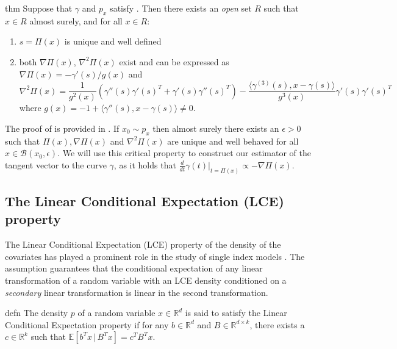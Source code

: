 \documentclass[11pt]{article}
\begin{document}
\begin{restatable}[Differentiability of $\Pi$]{thm}{} \label{thm: differentiability of pi}
    Suppose that $\gamma$ and $p_{x}$ satisfy . Then there exists an \textit{open} set $R$ such that $x \in R$ almost surely, and for all $x \in R$:
    \begin{enumerate}
        \item $s = \Pi(x)$ is unique and well defined
        \item both $\nabla\Pi(x)$, $\nabla^2\Pi(x)$ exist and can be expressed as $\nabla\Pi(x)  = -\gamma'(s)/g(x)$ and 
        \begin{equation}
            \nabla^2\Pi(x) = \frac{1}{g^2(x)}\left(\gamma''(s)\gamma'(s)^T + \gamma'(s)\gamma''(s)^T\right)- \frac{\langle\gamma^{(3)}(s), x - \gamma(s)\rangle}{g^3(x)}\gamma'(s)\gamma'(s)^T
        \end{equation}
        where $g(x) = -1 + \langle\gamma''(s), x-\gamma(s)\rangle \neq 0$. 
    \end{enumerate}
\end{restatable}

The proof of  is provided in . If $x_0 \sim p_x$ then almost surely there exists an $\epsilon >0$ such that $\Pi(x), \nabla\Pi(x)$ and $\nabla^2\Pi(x)$ are unique and well behaved for all $x \in \mathcal{B}(x_0, \epsilon).$ We will use this critical property to construct our estimator of the tangent vector to the curve $\gamma$, as it holds that $\frac{d}{dt}\gamma(t)\Big|_{t = \Pi(x)} \propto -\nabla\Pi(x)$.

\subsection{The Linear Conditional Expectation (LCE) property}
The Linear Conditional Expectation (LCE) property of the density of the covariates has played a prominent role in the study of single index models \cite{li1989regression, li1991sliced}. The assumption guarantees that the conditional expectation of any linear transformation of a random variable with an LCE density conditioned on a \textit{secondary} linear transformation is linear in the second transformation. 

\begin{restatable}{defn}{} \label{def: lce}
    The density $p$ of a random variable $x\in \mathbb{R}^d$ is said to satisfy the Linear Conditional Expectation property if for any $b \in \mathbb{R}^{d}$ and $B \in \mathbb{R}^{d\times k}$, there exists a $c\in \mathbb{R}^k$ such that $\mathbb{E}[b^Tx \,| \,B^Tx ] = c^TB^Tx.$
\end{restatable}
\end{document}
